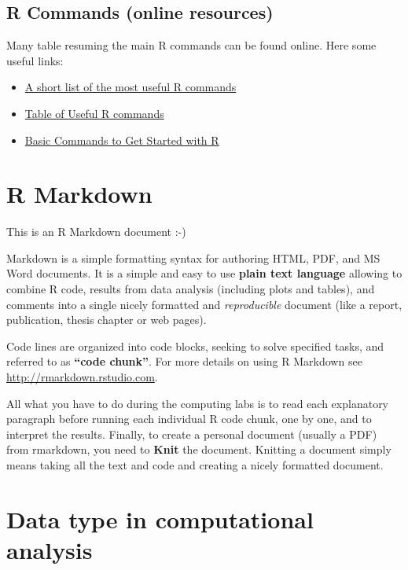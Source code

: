 \documentclass[
]{book}
\begin{document}
\hypertarget{r-commands-online-resources}{%
\subsection{R Commands (online resources)}\label{r-commands-online-resources}}

Many table resuming the main R commands can be found online.
Here some useful links:

\begin{itemize}
\item
  \href{https://www.maths.usyd.edu.au/u/jchan/Rcommands.pdf}{A short list of the most useful R commands}
\item
  \href{https://sites.calvin.edu/scofield/courses/m143/materials/RcmdsFromClass.pdf}{Table of Useful R commands}
\item
  \href{https://rpubs.com/ssammut/ResearchStats}{Basic Commands to Get Started with R}
\end{itemize}

\hypertarget{r-markdown}{%
\section{R Markdown}\label{r-markdown}}

This is an R Markdown document :-)

Markdown is a simple formatting syntax for authoring HTML, PDF, and MS Word documents.
It is a simple and easy to use \textbf{plain text language} allowing to combine R code, results from data analysis (including plots and tables), and comments into a single nicely formatted and \emph{reproducible} document (like a report, publication, thesis chapter or web pages).

Code lines are organized into code blocks, seeking to solve specified tasks, and referred to as \textbf{``code chunk''}.
For more details on using R Markdown see \url{http://rmarkdown.rstudio.com}.

All what you have to do during the computing labs is to read each explanatory paragraph before running each individual R code chunk, one by one, and to interpret the results.
Finally, to create a personal document (usually a PDF) from rmarkdown, you need to \textbf{Knit} the document.
Knitting a document simply means taking all the text and code and creating a nicely formatted document.

\hypertarget{data-type-in-computational-analysis}{%
\section{Data type in computational analysis}\label{data-type-in-computational-analysis}}
\end{document}
